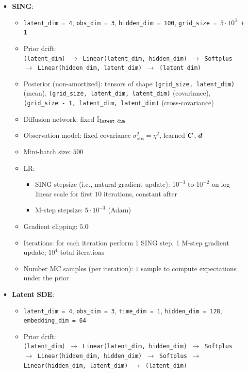 \begin{itemize}
\begin{itemize}
    \end{itemize}
    \item \textbf{SING}:
    \begin{itemize}
        \item \texttt{latent\_dim = 4}, \texttt{obs\_dim = 3},  \texttt{hidden\_dim = 100},
        \texttt{grid\_size = $5 \cdot 10^3$ + 1}
        \item 
        Prior drift:\\
        \texttt{(latent\_dim) $\to$ Linear(latent\_dim, hidden\_dim) $\to$ Softplus $\to$ Linear(hidden\_dim, latent\_dim) $\to$ (latent\_dim)}
        \item Posterior (non-amortized): tensors of shape \texttt{(grid\_size, latent\_dim)} (mean), \texttt{(grid\_size, latent\_dim, latent\_dim)} (covariance), \texttt{(grid\_size - 1, latent\_dim, latent\_dim)} (cross-covariance)
        \item Diffusion network: fixed $\mathbb{I}_{\texttt{latent\_dim}}$
        \item Observation model: fixed covariance $\sigma_{\mathrm{obs}}^2 = \eta^2$, learned $\boldsymbol{C}$, $\boldsymbol{d}$
        \item Mini-batch size: $500$
        \item LR: 
        \begin{itemize}
            \item SING stepsize (i.e., natural gradient update): $10^{-3}$ to $10^{-2}$ on log-linear scale for first $10$ iterations, constant after
            \item M-step stepsize: $5 \cdot 10^{-3}$ (Adam)
        \end{itemize}
        \item Gradient clipping: $5.0$
        \item Iterations: for each iteration perform 1 SING step, 1 M-step gradient update; $10^4$ total iterations
        \item Number MC samples (per iteration): $1$ sample to compute expectations under the prior
    \end{itemize}
    \item \textbf{Latent SDE}:
    \begin{itemize}
        \item \texttt{latent\_dim = 4}, \texttt{obs\_dim = 3},  \texttt{time\_dim = 1}, \texttt{hidden\_dim = 128}, \texttt{embedding\_dim = 64}
        \item 
        Prior drift:\\
        \texttt{(latent\_dim) $\to$ Linear(latent\_dim, hidden\_dim) $\to$ Softplus $\to$ Linear(hidden\_dim, hidden\_dim) $\to$ Softplus $\to$ Linear(hidden\_dim, latent\_dim) $\to$ (latent\_dim)}

\end{itemize}
\end{itemize}
